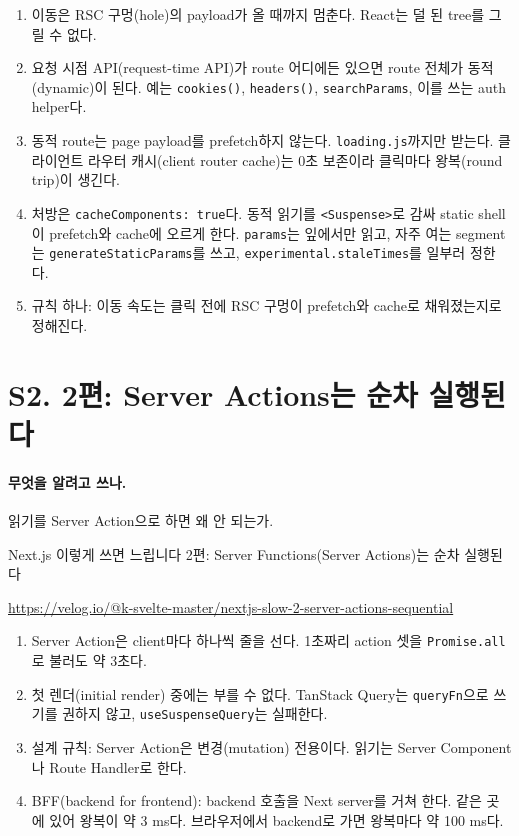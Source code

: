 \begin{enumerate}[nosep]
  \item 이동은 RSC 구멍(hole)의 payload가 올 때까지 멈춘다. React는 덜 된 tree를 그릴 수 없다.
  \item 요청 시점 API(request-time API)가 route 어디에든 있으면 route 전체가 동적(dynamic)이 된다. 예는 \texttt{cookies()}, \texttt{headers()}, \texttt{searchParams}, 이를 쓰는 auth helper다.
  \item 동적 route는 page payload를 prefetch하지 않는다. \texttt{loading.js}까지만 받는다. 클라이언트 라우터 캐시(client router cache)는 0초 보존이라 클릭마다 왕복(round trip)이 생긴다.
  \item 처방은 \texttt{cacheComponents: true}다. 동적 읽기를 \texttt{<Suspense>}로 감싸 static shell이 prefetch와 cache에 오르게 한다. \texttt{params}는 잎에서만 읽고, 자주 여는 segment는 \texttt{generateStaticParams}를 쓰고, \texttt{experimental.staleTimes}를 일부러 정한다.
  \item 규칙 하나: 이동 속도는 클릭 전에 RSC 구멍이 prefetch와 cache로 채워졌는지로 정해진다.
\end{enumerate}

\section{S2. 2편: Server Actions는 순차 실행된다}\label{sec:src-s2}

\paragraph{무엇을 알려고 쓰나.}
읽기를 Server Action으로 하면 왜 안 되는가.

\begin{description}[font=\bfseries\small, leftmargin=3.4em, labelwidth=3em, itemsep=1pt]
  \item[제목] Next.js 이렇게 쓰면 느립니다 2편: Server Functions(Server Actions)는 순차 실행된다
  \item[URL] {\footnotesize\url{https://velog.io/@k-svelte-master/nextjs-slow-2-server-actions-sequential}}
\end{description}

\begin{enumerate}[nosep]
  \item Server Action은 client마다 하나씩 줄을 선다. 1초짜리 action 셋을 \texttt{Promise.all}로 불러도 약 3초다.
  \item 첫 렌더(initial render) 중에는 부를 수 없다. TanStack Query는 \texttt{queryFn}으로 쓰기를 권하지 않고, \texttt{useSuspenseQuery}는 실패한다.
  \item 설계 규칙: Server Action은 변경(mutation) 전용이다. 읽기는 Server Component나 Route Handler로 한다.
  \item BFF(backend for frontend): backend 호출을 Next server를 거쳐 한다. 같은 곳에 있어 왕복이 약 3 ms다. 브라우저에서 backend로 가면 왕복마다 약 100 ms다.
\end{enumerate}

